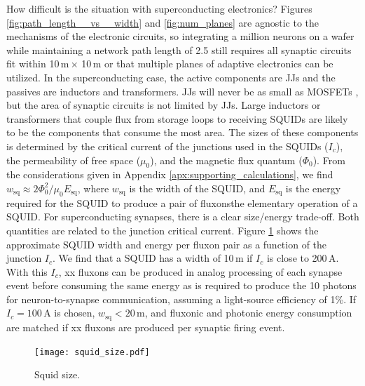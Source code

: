 \documentclass[twocolumn]{article}
\begin{document}
How difficult is the situation with superconducting electronics? Figures \ref{fig:path_length__vs__width} and \ref{fig:num_planes} are agnostic to the mechanisms of the electronic circuits, so integrating a million neurons on a wafer while maintaining a network path length of 2.5 still requires all synaptic circuits fit within 10\,\textmu m\,$\times$ 10\,\textmu m or that multiple planes of adaptive electronics can be utilized. In the superconducting case, the active components are JJs and the passives are inductors and transformers. JJs will never be as small as MOSFETs \cite{tolpygo2016superconductor}, but the area of synaptic circuits is not limited by JJs. Large inductors or transformers that couple flux from storage loops to receiving SQUIDs are likely to be the components that consume the most area. The sizes of these components is determined by the critical current of the junctions used in the SQUIDs ($I_c$), the permeability of free space ($\mu_0$), and the magnetic flux quantum ($\Phi_0$). From the considerations given in Appendix \ref{apx:supporting_calculations}, we find $w_{\mathrm{sq}} \approx 2\Phi_0^2/\mu_0 E_{\mathrm{sq}}$, where $w_{\mathrm{sq}}$ is the width of the SQUID, and $E_{\mathrm{sq}}$ is the energy required for the SQUID to produce a pair of fluxons\textemdash the elementary operation of a SQUID. For superconducting synapses, there is a clear size/energy trade-off. Both quantities are related to the junction critical current. Figure \ref{fig:squid_size} shows the approximate SQUID width and energy per fluxon pair as a function of the junction $I_c$. We find that a SQUID has a width of 10\,\textmu m if $I_c$ is close to 200\,\textmu A. With this $I_c$, xx fluxons can be produced in analog processing of each synapse event before consuming the same energy as is required to produce the 10 photons for neuron-to-synapse communication, assuming a light-source efficiency of 1\%. If $I_c = 100$\,\textmu A is chosen, $w_{\mathrm{sq}} < 20$\,\textmu m, and fluxonic and photonic energy consumption are matched if xx fluxons are produced per synaptic firing event.
\begin{figure}
    \centering
    \texttt{[image: squid\_size.pdf]}
    \caption{Squid size.}
    \label{fig:squid_size}
\end{figure}
\end{document}
